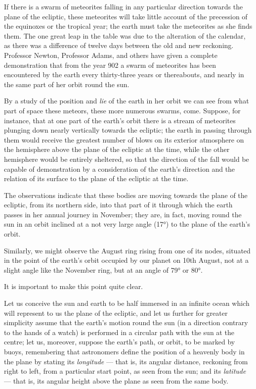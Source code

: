\documentclass[a4paper, 12pt, oneside, polutonikogreek, english]{article}
\begin{document}
If there is a swarm of meteorites falling in any particular direction towards the plane of the ecliptic, these meteorites will take little account of the precession of the equinoxes or the tropical year; the earth must take the meteorites as she finds them. The one great leap in the table was due to the alteration of the calendar, as there was a difference of twelve days between the old and new reckoning. Professor Newton, Professor Adams, and others have given a complete demonstration that from the year 902 a swarm of meteorites has been encountered by the earth every thirty-three years or thereabouts, and nearly in the same part of her orbit round the sun.

By a study of the position and \emph{lie} of the earth in her orbit we can see from what part of space these meteors, these more numerous swarms, come. Suppose, for instance, that at one part of the earth's orbit there is a stream of meteorites plunging down nearly vertically towards the ecliptic; the earth in passing through them would receive the greatest number of blows on its exterior atmosphere on the hemisphere above the plane of the ecliptic at the time, while the other hemisphere would be entirely sheltered, so that the direction of the fall would be capable of demonstration by a consideration of the earth's direction and the relation of its surface to the plane of the ecliptic at the time.

The observations indicate that these bodies are moving towards the plane of the ecliptic, from its northern side, into that part of it through which the earth passes in her annual journey in November; they are, in fact, moving round the sun in an orbit inclined at a not very large angle (17°) to the plane of the earth's orbit.

Similarly, we might observe the August ring rising from one of its nodes, situated in the point of the earth's orbit occupied by our planet on 10th August, not at a slight angle like the November ring, but at an angle of 79° or 80°.

It is important to make this point quite clear.

Let us conceive the sun and earth to be half immersed in an infinite ocean which will represent to us the plane of the ecliptic, and let us further for greater simplicity assume that the earth's motion round the sun (in a direction contrary to the hands of a watch) is performed in a circular path with the sun at the centre; let us, moreover, suppose the earth's path, or orbit, to be marked by buoys, remembering that astronomers define the position of a heavenly body in the plane by stating its \emph{longitude} --- that is, its angular distance, reckoning from right to left, from a particular start point, as seen from the sun; and its \emph{latitude} --- that is, its angular height above the plane as seen from the same body.
\end{document}
